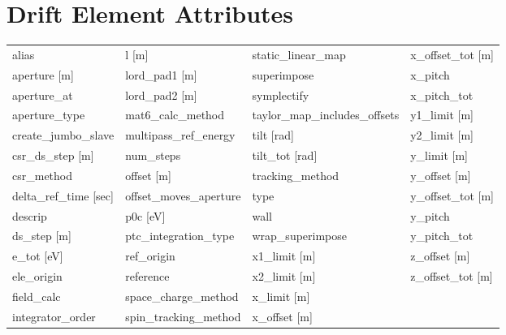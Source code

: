  \section{Drift Element Attributes}
 \label{s:list.drift}
 
 \begin{tabular}{llll} \toprule
alias                            & l [m]                            & static_linear_map                & x_offset_tot [m]                 \\
aperture [m]                     & lord_pad1 [m]                    & superimpose                      & x_pitch                          \\
aperture_at                      & lord_pad2 [m]                    & symplectify                      & x_pitch_tot                      \\
aperture_type                    & mat6_calc_method                 & taylor_map_includes_offsets      & y1_limit [m]                     \\
create_jumbo_slave               & multipass_ref_energy             & tilt [rad]                       & y2_limit [m]                     \\
csr_ds_step [m]                  & num_steps                        & tilt_tot [rad]                   & y_limit [m]                      \\
csr_method                       & offset [m]                       & tracking_method                  & y_offset [m]                     \\
delta_ref_time [sec]             & offset_moves_aperture            & type                             & y_offset_tot [m]                 \\
descrip                          & p0c [eV]                         & wall                             & y_pitch                          \\
ds_step [m]                      & ptc_integration_type             & wrap_superimpose                 & y_pitch_tot                      \\
e_tot [eV]                       & ref_origin                       & x1_limit [m]                     & z_offset [m]                     \\
ele_origin                       & reference                        & x2_limit [m]                     & z_offset_tot [m]                 \\
field_calc                       & space_charge_method              & x_limit [m]                      &                                  \\
integrator_order                 & spin_tracking_method             & x_offset [m]                     &                                  \\
 \bottomrule
 \end{tabular}
 \vfill
 
